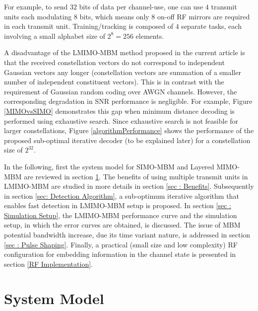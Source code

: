 For example, to send $32$ bits of data per channel-use, one can use $4$ transmit units each modulating $8$ bits, which means only $8$ on-off RF mirrors are required in each transmit unit.  
Training/tracking is composed of $4$ separate tasks, each involving a small alphabet size of $2^8 = 256$ elements.

A disadvantage of the LMIMO-MBM method proposed in the current article  is that the received constellation vectors do not correspond to independent Gaussian vectors any longer (constellation vectors are summation of a smaller number of independent constituent vectors). This is in contrast with the requirement of Gaussian random coding over AWGN channels. However, the corresponding degradation in SNR performance is negligible. For example, Figure \ref{MIMOvsSIMO}  demonstrates this gap when minimum distance decoding is performed using exhaustive search. Since exhaustive search is not feasible for larger constellations, Figure \ref{algorithmPerformance} shows the performance of the proposed sub-optimal iterative decoder (to be explained later) for a constellation size of $2 ^ {32}$.


In the following, first the system model for SIMO-MBM and Layered MIMO-MBM are reviewed in section \ref{sec : System Model}. The benefits of using multiple transmit units in LMIMO-MBM are studied in more details in section \ref{sec : Benefits}. Subsequently in section \ref{sec: Detection Algorithm}, a sub-optimum iterative algorithm that enables fast detection in LMIMO-MBM setup is proposed. In section \ref{sec : Simulation Setup}, the LMIMO-MBM performance curve and the simulation setup, in which the error curves are obtained, is discussed. The issue of MBM potential bandwidth increase, due its time variant nature, is addressed in section \ref{sec : Pulse Shaping}. Finally, a practical (small size and low complexity) RF  configuration for embedding information in the channel state is presented in section \ref{RF Implementation}.

\section{System Model}
\label{sec : System Model}
